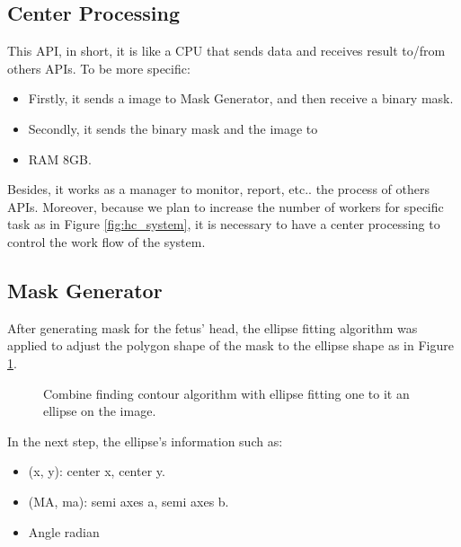 \subsection{Center Processing}
\noindent

	This API, in short, it is like a CPU that sends data and receives result to/from others APIs. To be more specific:
	
	\begin{itemize}
		\item Firstly, it sends a image to Mask Generator, and then receive a binary mask.
		\item Secondly, it sends the binary mask and the image to
		\item RAM 8GB.
	\end{itemize}
	
	Besides, it works as a manager to monitor, report, etc.. the process of others APIs. Moreover, because we plan to increase the number of workers for specific task as in Figure \ref{fig:hc_system}, it is necessary to have a center processing to control the work flow of the system.

\subsection{Mask Generator}



\noindent

	After generating mask for the fetus' head, the ellipse fitting algorithm was applied to adjust the polygon shape of the mask to the ellipse shape as in Figure \ref{fig:post_process}.
	
	\begin{figure}[H]
		\centering
		\hfill %
		\hfill %
		\caption{Combine finding contour algorithm with ellipse fitting one to  it an ellipse on the image.}
		\label{fig:post_process}
	\end{figure}

	In the next step, the ellipse's information such as:
	
	\begin{itemize}
		\item (x, y): center x, center y.
		\item (MA, ma): semi axes a, semi axes b.
		\item Angle radian
	\end{itemize}
	
\noindent
		
	
	